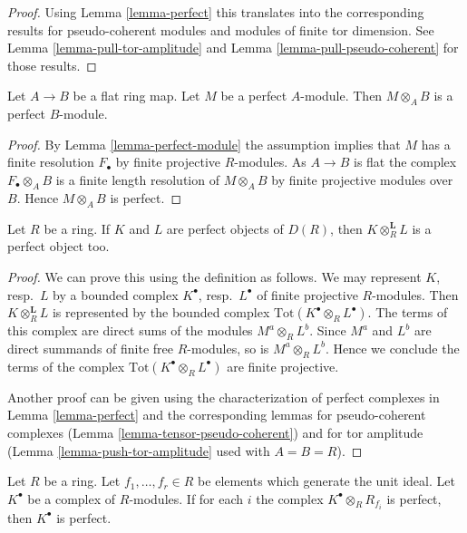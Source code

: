 \begin{proof}
Using
Lemma \ref{lemma-perfect}
this translates into the corresponding results for pseudo-coherent modules
and modules of finite tor dimension. See
Lemma \ref{lemma-pull-tor-amplitude}
and
Lemma \ref{lemma-pull-pseudo-coherent}
for those results.
\end{proof}

\begin{lemma}
\label{lemma-flat-base-change-perfect}
Let $A \to B$ be a flat ring map. Let $M$ be a perfect $A$-module.
Then $M \otimes_A B$ is a perfect $B$-module.
\end{lemma}

\begin{proof}
By
Lemma \ref{lemma-perfect-module}
the assumption implies that $M$ has a finite resolution $F_\bullet$ by
finite projective $R$-modules. As $A \to B$ is flat the complex
$F_\bullet \otimes_A B$ is a finite length resolution of $M \otimes_A B$
by finite projective modules over $B$. Hence $M \otimes_A B$ is perfect.
\end{proof}

\begin{lemma}
\label{lemma-tensor-perfect}
Let $R$ be a ring. If $K$ and $L$ are perfect objects of $D(R)$, then
$K \otimes_R^\mathbf{L} L$ is a perfect object too.
\end{lemma}

\begin{proof}
We can prove this using the definition as follows. We may represent
$K$, resp.\ $L$ by a bounded complex $K^\bullet$, resp.\ $L^\bullet$
of finite projective $R$-modules. Then $K \otimes_R^\mathbf{L} L$
is represented by the bounded complex
$\text{Tot}(K^\bullet \otimes_R L^\bullet)$.
The terms of this complex are direct sums of the modules
$M^a \otimes_R L^b$. Since $M^a$ and $L^b$ are direct summands
of finite free $R$-modules, so is $M^a \otimes_R L^b$. Hence we
conclude the terms of the complex $\text{Tot}(K^\bullet \otimes_R L^\bullet)$
are finite projective.

\medskip\noindent
Another proof can be given using the characterization of perfect
complexes in Lemma \ref{lemma-perfect} and the corresponding
lemmas for pseudo-coherent complexes (Lemma \ref{lemma-tensor-pseudo-coherent})
and for tor amplitude (Lemma \ref{lemma-push-tor-amplitude} used
with $A = B = R$).
\end{proof}

\begin{lemma}
\label{lemma-glue-perfect}
Let $R$ be a ring. Let $f_1, \ldots, f_r \in R$ be elements which
generate the unit ideal. Let $K^\bullet$
be a complex of $R$-modules. If for each $i$ the complex
$K^\bullet \otimes_R R_{f_i}$ is perfect,
then $K^\bullet$ is perfect.
\end{lemma}


